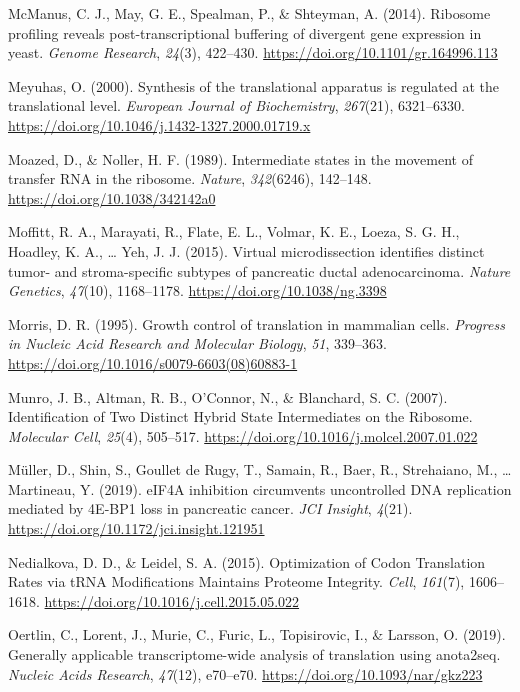 \documentclass[12pt,openany]{book}
\begin{document}
\hypertarget{ref-McManus2014}{}
McManus, C. J., May, G. E., Spealman, P., \& Shteyman, A. (2014).
Ribosome profiling reveals post-transcriptional buffering of divergent
gene expression in yeast. \emph{Genome Research}, \emph{24}(3),
422--430. \url{https://doi.org/10.1101/gr.164996.113}

\hypertarget{ref-Meyuhas2000}{}
Meyuhas, O. (2000). Synthesis of the translational apparatus is
regulated at the translational level. \emph{European Journal of
Biochemistry}, \emph{267}(21), 6321--6330.
\url{https://doi.org/10.1046/j.1432-1327.2000.01719.x}

\hypertarget{ref-Moazed1989}{}
Moazed, D., \& Noller, H. F. (1989). Intermediate states in the movement
of transfer RNA in the ribosome. \emph{Nature}, \emph{342}(6246),
142--148. \url{https://doi.org/10.1038/342142a0}

\hypertarget{ref-Moffitt2015}{}
Moffitt, R. A., Marayati, R., Flate, E. L., Volmar, K. E., Loeza, S. G.
H., Hoadley, K. A., \ldots{} Yeh, J. J. (2015). Virtual microdissection
identifies distinct tumor- and stroma-specific subtypes of pancreatic
ductal adenocarcinoma. \emph{Nature Genetics}, \emph{47}(10),
1168--1178. \url{https://doi.org/10.1038/ng.3398}

\hypertarget{ref-Morris1995}{}
Morris, D. R. (1995). Growth control of translation in mammalian cells.
\emph{Progress in Nucleic Acid Research and Molecular Biology},
\emph{51}, 339--363. \url{https://doi.org/10.1016/s0079-6603(08)60883-1}

\hypertarget{ref-Munro2007}{}
Munro, J. B., Altman, R. B., O'Connor, N., \& Blanchard, S. C. (2007).
Identification of Two Distinct Hybrid State Intermediates on the
Ribosome. \emph{Molecular Cell}, \emph{25}(4), 505--517.
\url{https://doi.org/10.1016/j.molcel.2007.01.022}

\hypertarget{ref-Muller2019}{}
Müller, D., Shin, S., Goullet de Rugy, T., Samain, R., Baer, R.,
Strehaiano, M., \ldots{} Martineau, Y. (2019). eIF4A inhibition
circumvents uncontrolled DNA replication mediated by 4E-BP1 loss in
pancreatic cancer. \emph{JCI Insight}, \emph{4}(21).
\url{https://doi.org/10.1172/jci.insight.121951}

\hypertarget{ref-Nedialkova2015}{}
Nedialkova, D. D., \& Leidel, S. A. (2015). Optimization of Codon
Translation Rates via tRNA Modifications Maintains Proteome Integrity.
\emph{Cell}, \emph{161}(7), 1606--1618.
\url{https://doi.org/10.1016/j.cell.2015.05.022}

\hypertarget{ref-Oertlin2019}{}
Oertlin, C., Lorent, J., Murie, C., Furic, L., Topisirovic, I., \&
Larsson, O. (2019). Generally applicable transcriptome-wide analysis of
translation using anota2seq. \emph{Nucleic Acids Research},
\emph{47}(12), e70--e70. \url{https://doi.org/10.1093/nar/gkz223}
\end{document}

